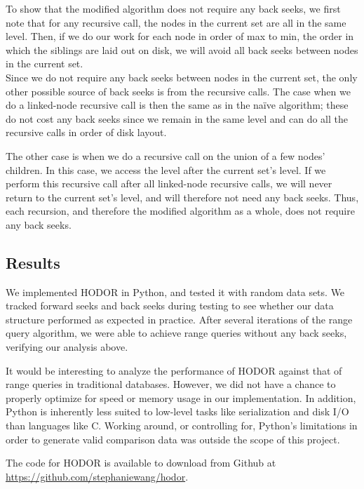\documentclass[11pt, oneside]{article}
\begin{document}
To show that the modified algorithm does not require any back seeks, we first
note that for any recursive call, the nodes in the current set are all in the
same level. Then, if we do our work for each node in order of max to min, the
order in which the siblings are laid out on disk, we will avoid all back seeks
between nodes in the current set. \\

Since we do not require any back seeks between nodes in the current set, the
only other possible source of back seeks is from the recursive calls.  The case
when we do a linked-node recursive call is then the same as in the na{\"i}ve
algorithm; these do not cost any back seeks since we remain in the same level
and can do all the recursive calls in order of disk layout. 

The other case is when we do a recursive call on the union of a few nodes'
children. In this case, we access the level after the current set's level. If we
perform this recursive call after all linked-node recursive calls, we will never
return to the current set's level, and will therefore not need any back seeks.
Thus, each recursion, and therefore the modified algorithm as a whole, does not
require any back seeks.

\subsection{Results}

We implemented HODOR in Python, and tested it with random data sets. We tracked
forward seeks and back seeks during testing to see whether our data structure
performed as expected in practice. After several iterations of the range query
algorithm, we were able to achieve range queries without any back seeks,
verifying our analysis above. 

It would be interesting to analyze the performance of HODOR against that of
range queries in traditional databases. However, we did not have a chance to
properly optimize for speed or memory usage in our implementation. In addition,
Python is inherently less suited to low-level tasks like serialization and
disk I/O than languages like C. Working around, or controlling for, Python's
limitations in order to generate valid comparison data was outside the scope of
this project. 

The code for HODOR is available to download from Github at
\url{https://github.com/stephaniewang/hodor}.
\end{document}
